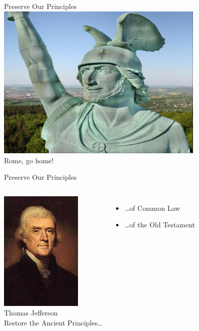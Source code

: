 \begin{frame}{Preserve Our Principles}
    \centering
    \includegraphics[width=0.75\textwidth]{img/herman3.png} \\
    Rome, go home! \\
\end{frame}

\begin{frame}{Preserve Our Principles}
    \begin{columns}[onlytextwidth]
            \centering
            \includegraphics[width=0.75\textwidth]{img/jefferson.png} \\
            Thomas Jefferson \\

            Restore the Ancient Principles\ldots
            \begin{itemize}
                \item \ldots of Common Law
                \item \ldots of the Old Testament
            \end{itemize}
    \end{columns}
\end{frame}

